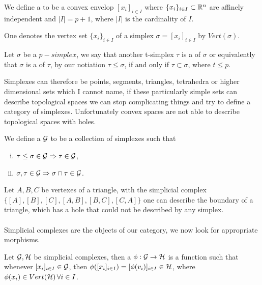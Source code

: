 \documentclass[../1.tex]{subfiles}
\begin{document}
    \begin{defn}
        We define a  to be a convex envelop $[ x_i ]_{i \in I}$
        where $\{x_i\}_{i \in I} \subset \mathbb{R}^n$ are affinely independent and $|I| = p + 1$, where $|I|$ is the cardinality
        of $I$.
    \end{defn}
    
    One denotes the vertex set $\{ x_i \}_{i \in I}$ of a simplex $\sigma = [ x_i ]_{i \in I}$ by $Vert(\sigma)$.
    
    \begin{defn}
        Let $\sigma$ be a $p-simplex$, we say that another t-simplex $\tau$ is a  of $\sigma$ or equivalently 
        that $\sigma$ is a  of $\tau$, by our notiation $\tau \leq \sigma$, if and only if $\tau \subset \sigma$, where $t \leq p$.
    \end{defn}

    Simplexes can therefore be points, segments, triangles, tetrahedra or higher dimensional sets which I cannot name, if these particularly simple
    sets can describe topological spaces we can stop complicating things and try to define a category of simplexes. Unfortunately convex spaces are
    not able to describe topological spaces with holes.

    \begin{defn}
        We define a  $\mathcal{G}$ to be a collection of simplexes such that
        \begin{enumerate}[(i)]
            \item $ \tau \leq \sigma \in \mathcal{G} \Rightarrow \tau \in \mathcal{G}$,
            \item $ \sigma, \tau \in \mathcal{G} \Rightarrow \sigma \cap \tau \in \mathcal{G}$.
        \end{enumerate}
    \end{defn}

    Let $A,B,C$ be vertexes of a triangle, with the simplicial complex $\{[A],[B],[C],[A,B],[B,C],[C,A]\}$ one can describe the boundary of a triangle, which has
    a hole that could not be described by any simplex.\\
    \hfill \\
    Simplicial complexes are the objects of our category, we now look for appropriate morphisms.

    \begin{defn}
        Let $\mathcal{G},\mathcal{H}$ be simplicial complexes, then a  $\phi : \mathcal{G} \to \mathcal{H}$ is a function 
        such that whenever $[ x_i ]_{i \in I} \in \mathcal{G}$, then $\phi([ x_i ]_{i \in I}) = [ \phi(v_i) ]_{i \in I} \in \mathcal{H}$,
        where $\phi(x_i) \in Vert(\mathcal{H}) \, \forall i \in I$.
    \end{defn}
\end{document}
